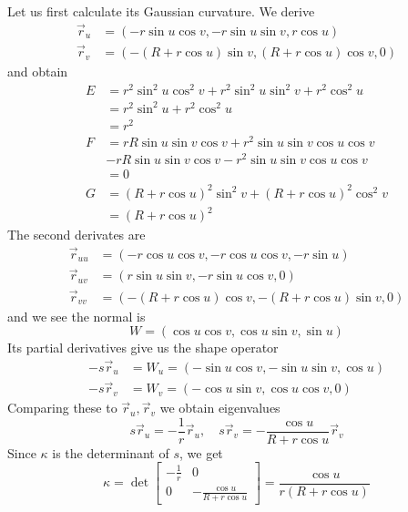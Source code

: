 \documentclass[a4paper, 12pt]{article}
\begin{document}
\begin{Exercise}
\begin{enumerate}[label=(\roman*)]
            Let us first calculate its Gaussian curvature.
            We derive
            \begin{align*}
                \vec{r}_u &= (-r\sin u \cos v, -r\sin u \sin v, r\cos u) \\
                \vec{r}_v &= (-(R + r\cos u)\sin v, (R + r\cos u)\cos v, 0)
            \end{align*}
            and obtain
            \begin{align*}
                E
                &= r^2\sin^2u\cos^2v + r^2\sin^2u\sin^2v + r^2\cos^2u \\
                &= r^2\sin^2u + r^2\cos^2u \\
                &= r^2 \\
                F
                &= rR\sin u \sin v \cos v + r^2\sin u \sin v \cos u \cos v \\
                &- rR\sin u \sin v\cos v - r^2\sin u\sin v\cos u\cos v \\
                &= 0 \\
                G
                &= (R + r\cos u)^2 \sin^2v + (R + r\cos u)^2 \cos^2 v \\
                &= (R + r\cos u)^2
            \end{align*}
            The second derivates are
            \begin{align*}
                \vec{r}_{uu} &= (-r\cos u\cos v, -r\cos u\cos v, -r\sin u) \\
                \vec{r}_{uv} &= (r\sin u\sin v, -r\sin u\cos v, 0) \\
                \vec{r}_{vv} &= (-(R + r\cos u)\cos v, -(R + r\cos u)\sin v, 0)
            \end{align*}
            and we see the normal is
            \[
                W = (\cos u \cos v, \cos u \sin v, \sin u)
            \]
            Its partial derivatives give us the shape operator
            \begin{align*}
                -s\vec{r}_u
                &= W_u
                = (-\sin u\cos v, -\sin u \sin v, \cos u) \\
                -s\vec{r}_v
                &= W_v
                = (- \cos u \sin v, \cos u\cos v, 0)
            \end{align*}
            Comparing these to $\vec{r}_u,\vec{r}_v$ we obtain eigenvalues
            \[
                s\vec{r}_u = -\frac{1}{r}\vec{r}_u,\quad s\vec{r}_v = -\frac{\cos u}{R + r\cos u}\vec{r}_v
            \]
            Since $\kappa$ is the determinant of $s$, we get
            \[
                \kappa
                = \det
                \begin{bmatrix}
                    -\frac{1}{r} & 0 \\
                    0 & -\frac{\cos u}{R + r\cos u}
                \end{bmatrix}
                = \frac{\cos u}{r(R + r\cos u)}
            \]


\end{enumerate}
\end{Exercise}
\end{document}
